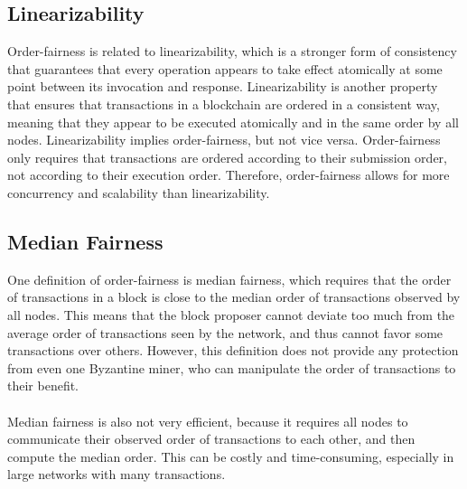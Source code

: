 \subsection*{Linearizability}
Order-fairness is related to linearizability, which is a stronger form of consistency that guarantees that every operation appears to take effect atomically at some point between its invocation and response. Linearizability is another property that ensures that transactions in a blockchain are ordered in a consistent way, meaning that they appear to be executed atomically and in the same order by all nodes. Linearizability implies order-fairness, but not vice versa. Order-fairness only requires that transactions are ordered according to their submission order, not according to their execution order. Therefore, order-fairness allows for more concurrency and scalability than linearizability. 
\subsection*{Median Fairness}
One definition of order-fairness is median fairness, which requires that the order of transactions in a block is close to the median order of transactions observed by all nodes. This means that the block proposer cannot deviate too much from the average order of transactions seen by the network, and thus cannot favor some transactions over others. However, this definition does not provide any protection from even one Byzantine miner, who can manipulate the order of transactions to their benefit.\\\\
Median fairness is also not very efficient, because it requires all nodes to communicate their observed order of transactions to each other, and then compute the median order. This can be costly and time-consuming, especially in large networks with many transactions. 

